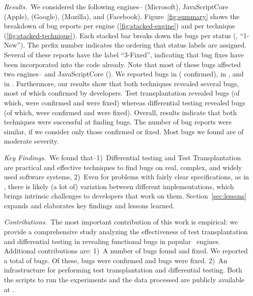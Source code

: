 \documentclass[smallextended]{svjour3}
\begin{document}
\sloppy \emph{Results.}~We considered the following engines--\chakra{}
(Microsoft), JavaScriptCore (Apple), \veight{} (Google),
\smonkey{} (Mozilla), and \hermes (Facebook). Figure~\ref{fig:summary} shows the breakdown of bug reports per engine (\ref{fig:stacked-engine}) and per technique
(\ref{fig:stacked-technique}).
Each stacked bar breaks down the bugs
per status (\eg{}, ``1-New''). The prefix number indicates the
ordering that status labels are assigned. Several of these
reports have the label ``3-Fixed'', indicating that bug fixes have
been incorporated into the code already. Note that most of these bugs
affected two engines--\chakra{} and JavaScriptCore (\jsc).  We
reported \noBugsBugsReportedGoogle{} bugs in \veight{}
(\noBugsBugsConfirmedGoogle{} confirmed),
\noBugsBugsReportedHermes in \hermes,
and \noBugsBugsReportedSMonkey in \smonkey{}.
Furthermore, our results show that both techniques revealed several
bugs, most of which confirmed by developers. Test transplantation
revealed \noBugsTransplantation bugs (of which,
\noBugsTransplantationConfirmed were confirmed and
\noBugsTransplantationFixed were fixed) whereas differential testing
revealed \noBugsDifferentialTesting bugs (of which,
\noBugsDifferentialTestingConfirmed were confirmed and
\noBugsDifferentialTestingFixed were fixed).  Overall, results
indicate that both techniques were successful at finding bugs. The
number of bug reports were similar, if we consider only those
confirmed or fixed. Most bugs we found are of moderate severity.



\emph{Key Findings.}~We found that--1)~Differential testing and Test
Transplantation are practical and effective techniques to find bugs on real,
complex, and widely used software systems, 2)~Even for problems with
fairly clear specifications, as in \javascript{}, there is likely (a
lot of) variation between different implementations, which brings intrinsic
challenges to developers that work on them.
Section~\ref{sec:lessons} expands and elaborates key
findings and lessons learned.

\emph{Contributions.}~The most important contribution of this work is empirical:
we provide a comprehensive study analyzing the effectiveness of
test transplantation and differential testing
in revealing functional bugs in popular \javascript\ engines.
Additional contributions are:
1)~A number of bugs found and fixed.
We reported a total of \totalBugsReported bugs.
Of these, \totalBugsConfirmed bugs were confirmed and \totalBugsFixed bugs were fixed.
2)~An infrastructure for performing test transplantation and differential testing.
Both the scripts to run the experiments and the data processed are publicly available at \dataRepo.
\end{document}

